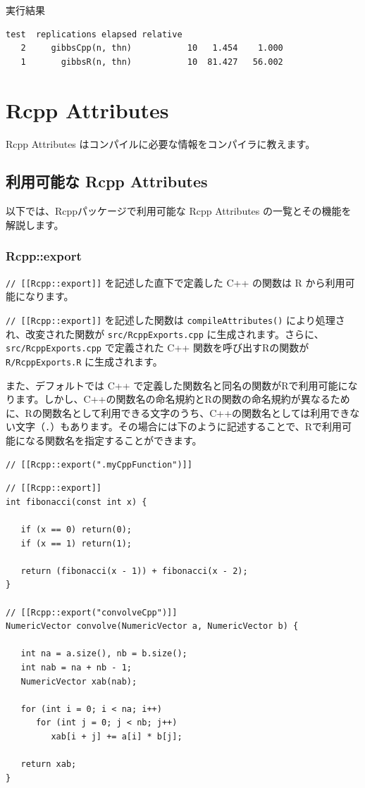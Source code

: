 \documentclass[]{book}
\begin{document}
実行結果

\begin{verbatim}
test  replications elapsed relative
   2     gibbsCpp(n, thn)           10   1.454    1.000
   1       gibbsR(n, thn)           10  81.427   56.002
\end{verbatim}

\hypertarget{rcpp-attributes}{%
\chapter{Rcpp Attributes}\label{rcpp-attributes}}

Rcpp Attributes はコンパイルに必要な情報をコンパイラに教えます。

\hypertarget{-rcpp-attributes}{%
\section{利用可能な Rcpp Attributes}\label{-rcpp-attributes}}

以下では、Rcppパッケージで利用可能な Rcpp Attributes の一覧とその機能を解説します。

\hypertarget{rcppexport}{%
\subsection{Rcpp::export}\label{rcppexport}}

\texttt{//\ {[}{[}Rcpp::export{]}{]}} を記述した直下で定義した C++ の関数は R から利用可能になります。

\texttt{//\ {[}{[}Rcpp::export{]}{]}} を記述した関数は \texttt{compileAttributes()} により処理され、改変された関数が \texttt{src/RcppExports.cpp} に生成されます。さらに、\texttt{src/RcppExports.cpp} で定義された C++ 関数を呼び出すRの関数が \texttt{R/RcppExports.R} に生成されます。

また、デフォルトでは C++ で定義した関数名と同名の関数がRで利用可能になります。しかし、C++の関数名の命名規約とRの関数の命名規約が異なるために、Rの関数名として利用できる文字のうち、C++の関数名としては利用できない文字（\texttt{.}）もあります。その場合には下のように記述することで、Rで利用可能になる関数名を指定することができます。

\begin{verbatim}
// [[Rcpp::export(".myCppFunction")]]
\end{verbatim}

\begin{verbatim}
// [[Rcpp::export]]
int fibonacci(const int x) {

   if (x == 0) return(0);
   if (x == 1) return(1);

   return (fibonacci(x - 1)) + fibonacci(x - 2);
}

// [[Rcpp::export("convolveCpp")]]
NumericVector convolve(NumericVector a, NumericVector b) {

   int na = a.size(), nb = b.size();
   int nab = na + nb - 1;
   NumericVector xab(nab);

   for (int i = 0; i < na; i++)
      for (int j = 0; j < nb; j++)
         xab[i + j] += a[i] * b[j];

   return xab;
}
\end{verbatim}
\end{document}
